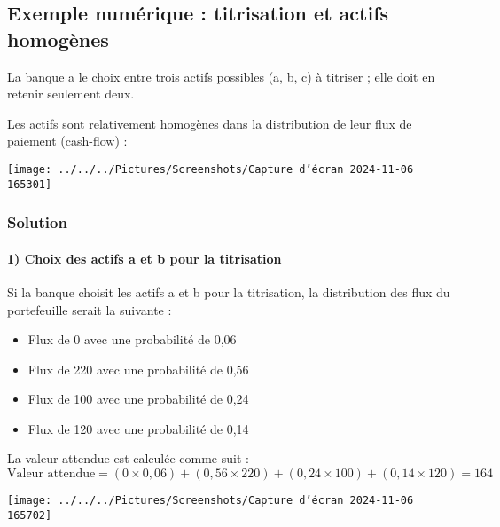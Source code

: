 \documentclass[a4paper, 12pt]{report}
\begin{document}
\subsection{Exemple numérique : titrisation et actifs homogènes}

La banque a le choix entre trois actifs possibles (a, b, c) à titriser ; elle doit en retenir seulement deux.

Les actifs sont relativement homogènes dans la distribution de leur flux de paiement (cash-flow) :
\begin{center}
	\texttt{[image: ../../../Pictures/Screenshots/Capture d'écran 2024-11-06 165301]}
\end{center}

\subsubsection{Solution}

\paragraph{1) Choix des actifs a et b pour la titrisation}

Si la banque choisit les actifs a et b pour la titrisation, la distribution des flux du portefeuille serait la suivante :

\begin{itemize}
	\item Flux de 0 avec une probabilité de 0,06
	\item Flux de 220 avec une probabilité de 0,56
	\item Flux de 100 avec une probabilité de 0,24
	\item Flux de 120 avec une probabilité de 0,14
\end{itemize}

La valeur attendue est calculée comme suit :
\[
\text{Valeur attendue}  = (0 \times 0,06) + (0,56 \times 220) + (0,24 \times 100) + (0,14 \times 120) = 164
\]

\begin{center}
	\texttt{[image: ../../../Pictures/Screenshots/Capture d'écran 2024-11-06 165702]}
\end{center}
\end{document}
